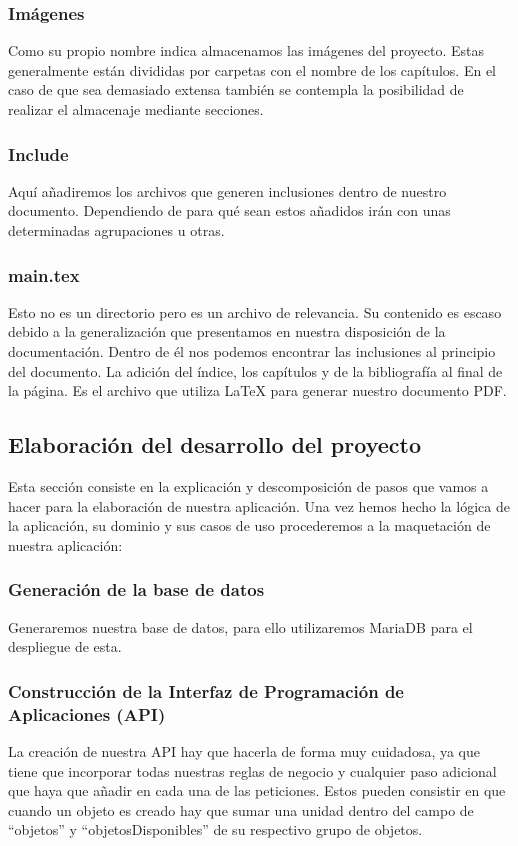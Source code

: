 \subsubsection{Imágenes}
Como su propio nombre indica almacenamos las imágenes del proyecto. Estas generalmente están divididas por carpetas con el nombre de los capítulos. En el caso de que sea demasiado extensa también se contempla la posibilidad de realizar el almacenaje mediante secciones.

\subsubsection{Include}
Aquí añadiremos los archivos que generen inclusiones dentro de nuestro documento. Dependiendo de para qué sean estos añadidos irán con unas determinadas agrupaciones u otras.

\subsubsection{main.tex}
Esto no es un directorio pero es un archivo de relevancia. Su contenido es escaso debido a la generalización que presentamos en nuestra disposición de la documentación. Dentro de él nos podemos encontrar las inclusiones al principio del documento. La adición del índice, los capítulos y de la bibliografía al final de la página. Es el archivo que utiliza LaTeX para generar nuestro documento PDF.


\subsection{Elaboración del desarrollo del proyecto}

Esta sección consiste en la explicación y descomposición de pasos que vamos a hacer para la elaboración de nuestra aplicación. Una vez hemos hecho la lógica de la aplicación, su dominio y sus casos de uso procederemos a la maquetación de nuestra aplicación:

\subsubsection{Generación de la base de datos}

Generaremos nuestra base de datos, para ello utilizaremos MariaDB para el despliegue de esta.

\subsubsection{Construcción de la Interfaz de Programación de Aplicaciones (API)}
La creación de nuestra API hay que hacerla de forma muy cuidadosa, ya que tiene que incorporar todas nuestras reglas de negocio y cualquier paso adicional que haya que añadir en cada una de las peticiones. Estos pueden consistir en que cuando un objeto es creado hay que sumar una unidad dentro del campo de ``objetos'' y ``objetosDisponibles'' de su respectivo grupo de objetos.

